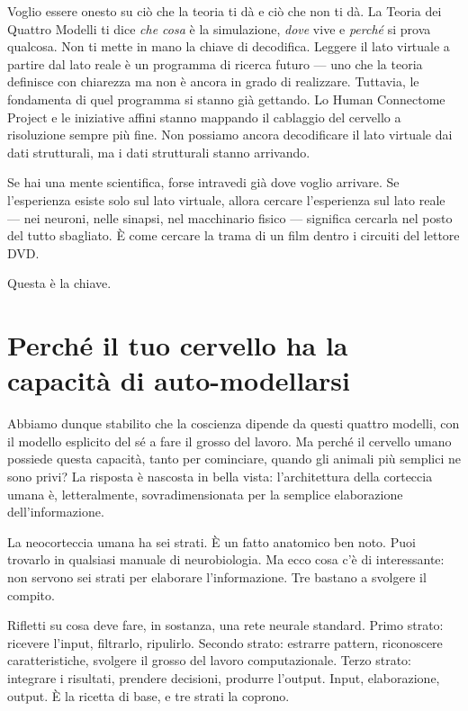 \documentclass[11pt, twoside, openright]{book}
\begin{document}
Voglio essere onesto su ciò che la teoria ti dà e ciò che non ti dà. La Teoria dei Quattro Modelli ti dice \textit{che cosa} è la simulazione, \textit{dove} vive e \textit{perché} si prova qualcosa. Non ti mette in mano la chiave di decodifica. Leggere il lato virtuale a partire dal lato reale è un programma di ricerca futuro --- uno che la teoria definisce con chiarezza ma non è ancora in grado di realizzare. Tuttavia, le fondamenta di quel programma si stanno già gettando. Lo Human Connectome Project e le iniziative affini stanno mappando il cablaggio del cervello a risoluzione sempre più fine. Non possiamo ancora decodificare il lato virtuale dai dati strutturali, ma i dati strutturali stanno arrivando.

Se hai una mente scientifica, forse intravedi già dove voglio arrivare. Se l'esperienza esiste solo sul lato virtuale, allora cercare l'esperienza sul lato reale --- nei neuroni, nelle sinapsi, nel macchinario fisico --- significa cercarla nel posto del tutto sbagliato. È come cercare la trama di un film dentro i circuiti del lettore DVD.

Questa è la chiave.

\section*{Perché il tuo cervello ha la capacità di auto-modellarsi}

Abbiamo dunque stabilito che la coscienza dipende da questi quattro modelli, con il modello esplicito del sé a fare il grosso del lavoro. Ma perché il cervello umano possiede questa capacità, tanto per cominciare, quando gli animali più semplici ne sono privi? La risposta è nascosta in bella vista: l'architettura della corteccia umana è, letteralmente, sovradimensionata per la semplice elaborazione dell'informazione.

La neocorteccia umana ha sei strati. È un fatto anatomico ben noto. Puoi trovarlo in qualsiasi manuale di neurobiologia. Ma ecco cosa c'è di interessante: non servono sei strati per elaborare l'informazione. Tre bastano a svolgere il compito.

Rifletti su cosa deve fare, in sostanza, una rete neurale standard. Primo strato: ricevere l'input, filtrarlo, ripulirlo. Secondo strato: estrarre pattern, riconoscere caratteristiche, svolgere il grosso del lavoro computazionale. Terzo strato: integrare i risultati, prendere decisioni, produrre l'output. Input, elaborazione, output. È la ricetta di base, e tre strati la coprono.
\end{document}
